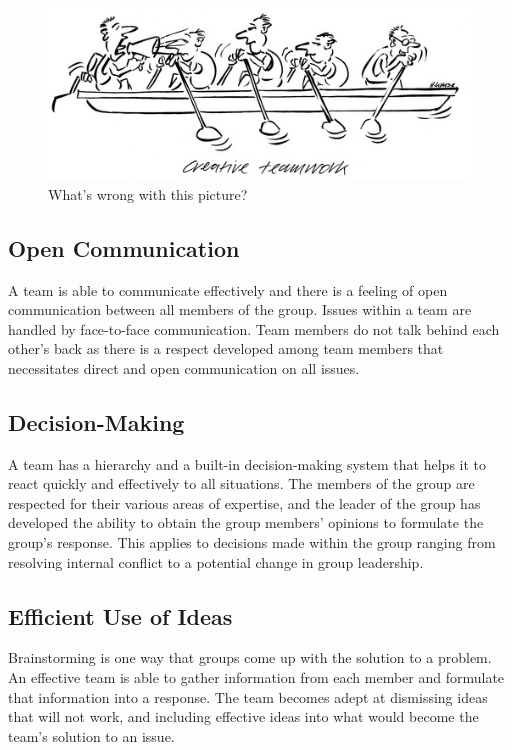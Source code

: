 \documentclass{article}\usepackage[]{graphicx}\usepackage[]{color}
\begin{document}
\begin{figure}
\includegraphics[width=1.00\textwidth]{../figure/creative_teamwork.jpg}
\caption{What's wrong with this picture?}
\end{figure}

\subsection{Open Communication}
A team is able to communicate effectively and there is a feeling of open communication between all members of the group. Issues within a team are handled by face-to-face communication. Team members do not talk behind each other's back as there is a respect developed among team members that necessitates direct and open communication on all issues.

\subsection{Decision-Making}
A team has a hierarchy and a built-in decision-making system that helps it to react quickly and effectively to all situations. The members of the group are respected for their various areas of expertise, and the leader of the group has developed the ability to obtain the group members' opinions to formulate the group's response. This applies to decisions made within the group ranging from resolving internal conflict to a potential change in group leadership.

\subsection{Efficient Use of Ideas}

Brainstorming is one way that groups come up with the solution to a problem. An effective team is able to gather information from each member and formulate that information into a response. The team becomes adept at dismissing ideas that will not work, and including effective ideas into what would become the team's solution to an issue.
\end{document}
